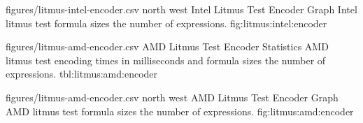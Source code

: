 
\EncoderStatsGraph
  {figures/litmus-intel-encoder.csv}
  {north west}
  {Intel Litmus Test Encoder Graph}
  {Intel litmus test formula sizes  the number of expressions.}
  {fig:litmus:intel:encoder}

\EncoderStatsTable
  {figures/litmus-amd-encoder.csv}
  {\textnumero}
  {\AMDRowHeader}
  {AMD Litmus Test Encoder Statistics}
  {AMD litmus test encoding times in milliseconds and formula sizes  the number of expressions.}
  {tbl:litmus:amd:encoder}


\EncoderStatsGraph
  {figures/litmus-amd-encoder.csv}
  {north west}
  {AMD Litmus Test Encoder Graph}
  {AMD litmus test formula sizes  the number of expressions.}
  {fig:litmus:amd:encoder}




\newpage


